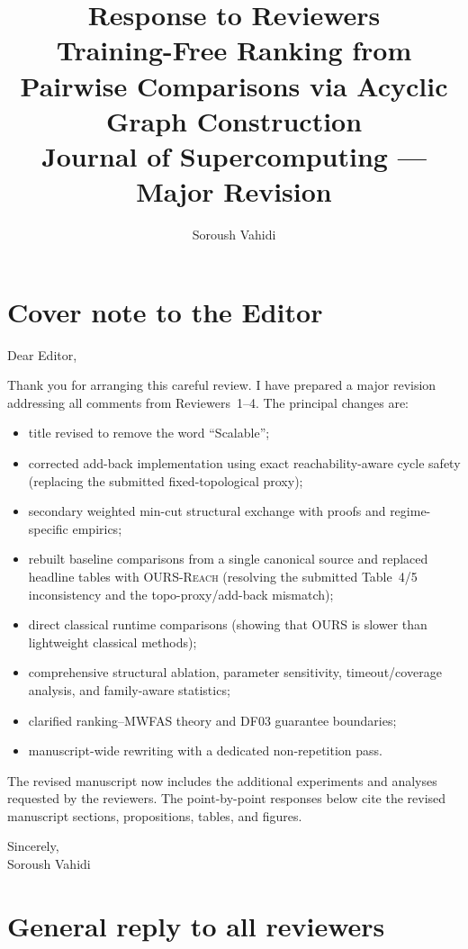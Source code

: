 \documentclass[11pt]{article}
\title{Response to Reviewers\\[0.4em]
\large Training-Free Ranking from Pairwise Comparisons via Acyclic Graph Construction\\[0.2em]
\normalsize Journal of Supercomputing --- Major Revision}
\author{Soroush Vahidi}
\date{}
\begin{document}
\maketitle

\section*{Cover note to the Editor}

Dear Editor,

Thank you for arranging this careful review. I have prepared a major revision addressing all comments from Reviewers~1--4. The principal changes are:
\begin{itemize}
\item title revised to remove the word ``Scalable'';
\item corrected add-back implementation using exact reachability-aware cycle safety (replacing the submitted fixed-topological proxy);
\item secondary weighted min-cut structural exchange with proofs and regime-specific empirics;
\item rebuilt baseline comparisons from a single canonical source and replaced headline tables with \textsc{OURS-Reach} (resolving the submitted Table~4/5 inconsistency and the topo-proxy/add-back mismatch);
\item direct classical runtime comparisons (showing that OURS is slower than lightweight classical methods);
\item comprehensive structural ablation, parameter sensitivity, timeout/coverage analysis, and family-aware statistics;
\item clarified ranking--MWFAS theory and DF03 guarantee boundaries;
\item manuscript-wide rewriting with a dedicated non-repetition pass.
\end{itemize}
The revised manuscript now includes the additional experiments and analyses requested by the reviewers. The point-by-point responses below cite the revised manuscript sections, propositions, tables, and figures.

\vspace{0.8em}
\noindent Sincerely,\\
Soroush Vahidi

\section*{General reply to all reviewers}
\end{document}
